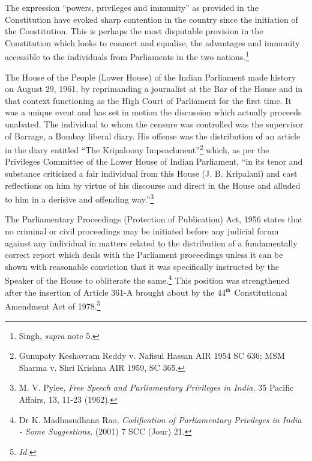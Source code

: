 \begin{multicols}{2}
\vspace{-.1cm}

\noi
The expression “powers, privileges and immunity” as provided in the Constitution have
evoked sharp contention in the country since the initiation of the Constitution. This is perhaps
the most disputable provision in the Constitution which looks to connect and equalise, the
advantages and immunity accessible to the individuals from Parliaments in the two nations.\footnote{Singh, \textit{supra} note 5.}

\vspace{-.1cm}

\noi
The House of the People (Lower House) of the Indian Parliament made history on August 29,
1961, by reprimanding a journalist at the Bar of the House and in that context functioning as
the High Court of Parliament for the first time. It was a unique event and has set in motion
the discussion which actually proceeds unabated. The individual to whom the censure was
controlled was the supervisor of Barrage, a Bombay liberal diary. His offense was the
distribution of an article in the diary entitled “The Kripaloony Impeachment”\footnote{Gunupaty Keshavram Reddy v. Nafisul Hassan AIR 1954 SC 636; MSM Sharma v. Shri Krishna AIR 1959, SC 365.} which, as per
the Privileges Committee of the Lower House of Indian Parliament, “in its tenor and
substance criticized a fair individual from this House (J. B. Kripalani) and cast reflections on
him by virtue of his discourse and direct in the House and alluded to him in a derisive and
offending way.”\footnote{M. V. Pylee, \textit{Free Speech and Parliamentary Privileges in India,} 35 Pacific Affairs, 13, 11-23 (1962).}

\vspace{-.1cm}

\noi
The Parliamentary Proceedings (Protection of Publication) Act, 1956 states that no criminal
or civil proceedings may be initiated before any judicial forum against any individual in
matters related to the distribution of a fundamentally correct report which deals with the
Parliament proceedings unless it can be shown with reasonable conviction that it was
specifically instructed by the Speaker of the House to obliterate the same.\footnote{Dr K. Madhusudhana Rao, \textit{Codification of Parliamentary Privileges in India - Some Suggestions,} (2001) 7 SCC (Jour) 21.} This position was 
strengthened after the insertion of Article 361-A brought about by the 44$^{\rm th}$ Constitutional
Amendment Act of 1978.\footnote{\textit{Id.}}


\end{multicols}
